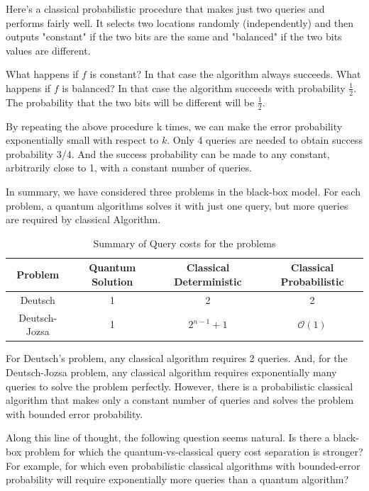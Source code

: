 \documentclass[12pt, oneside]{book}
\theoremstyle{definition}
\theoremstyle{definition}
\theoremstyle{remark}
\begin{document}
Here's a classical probabilistic procedure that makes just two queries and performs fairly well. It selects two locations randomly (independently) and then outputs "constant" if the two bits are the same and "balanced" if the two bits values are different.

What happens if $f$ is constant? In that case the algorithm always succeeds. What happens if $f$ is balanced? In that case the algorithm succeeds with probability $\frac{1}{2}$. The probability that the two bits will be different will be $\frac{1}{2}$.

By repeating the above procedure k times, we can make the error probability exponentially small with respect to $k$. Only 4 queries are needed to obtain success probability $3/4$. And the success probability can be made to any constant, arbitrarily close to 1, with a constant number of queries.

In summary, we have considered three problems in the black-box model. For each problem, a quantum algorithms solves it with just one query, but more queries are required by classical Algorithm.

\begin{table}[H]
    \centering
    \begin{tabular}{|c|c|c|c|}
    \hline
        Problem & Quantum Solution & Classical Deterministic & Classical Probabilistic\\
        \hline
         Deutsch & 1 & 2 & 2\\
         \hline
         Deutsch-Jozsa & 1 & $2^{n-1}+1$ & $\mathcal{O}(1)$\\
         \hline
    \end{tabular}
    \caption{Summary of Query costs for the problems}
    \label{tab:deutsch_querycost}
\end{table}
For Deutsch's problem, any classical algorithm requires 2 queries. And, for the Deutsch-Jozsa problem, any classical algorithm requires exponentially many queries to solve the problem perfectly. However, there is a probabilistic classical algorithm that makes only a constant number of queries and solves the problem with bounded error probability.

Along this line of thought, the following question seems natural. Is there a black-box problem for which the quantum-vs-classical query cost separation is stronger? For example, for which even probabilistic classical algorithms with bounded-error probability will require exponentially more queries than a quantum algorithm?
\end{document}

